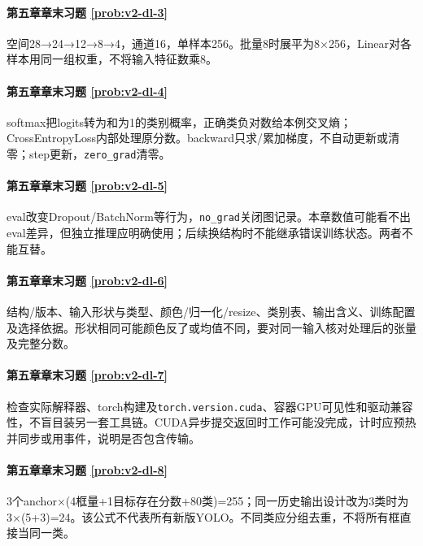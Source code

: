 \paragraph*{第五章章末习题 \ref{prob:v2-dl-3}}
\begin{solution}
空间28→24→12→8→4，通道16，单样本256。批量8时展平为8×256，Linear对各样本用同一组权重，不将输入特征数乘8。
\end{solution}
\paragraph*{第五章章末习题 \ref{prob:v2-dl-4}}
\begin{solution}
softmax把logits转为和为1的类别概率，正确类负对数给本例交叉熵；CrossEntropyLoss内部处理原分数。backward只求/累加梯度，不自动更新或清零；step更新，\texttt{zero\_grad}清零。
\end{solution}
\paragraph*{第五章章末习题 \ref{prob:v2-dl-5}}
\begin{solution}
eval改变Dropout/BatchNorm等行为，\texttt{no\_grad}关闭图记录。本章数值可能看不出eval差异，但独立推理应明确使用；后续换结构时不能继承错误训练状态。两者不能互替。
\end{solution}
\paragraph*{第五章章末习题 \ref{prob:v2-dl-6}}
\begin{solution}
结构/版本、输入形状与类型、颜色/归一化/resize、类别表、输出含义、训练配置及选择依据。形状相同可能颜色反了或均值不同，要对同一输入核对处理后的张量及完整分数。
\end{solution}
\paragraph*{第五章章末习题 \ref{prob:v2-dl-7}}
\begin{solution}
检查实际解释器、torch构建及\texttt{torch.version.cuda}、容器GPU可见性和驱动兼容性，不盲目装另一套工具链。CUDA异步提交返回时工作可能没完成，计时应预热并同步或用事件，说明是否包含传输。
\end{solution}
\paragraph*{第五章章末习题 \ref{prob:v2-dl-8}}
\begin{solution}
3个anchor×(4框量+1目标存在分数+80类)=255；同一历史输出设计改为3类时为3×(5+3)=24。该公式不代表所有新版YOLO。不同类应分组去重，不将所有框直接当同一类。
\end{solution}
